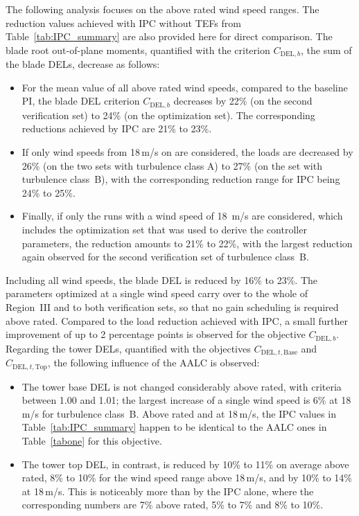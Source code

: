 The following analysis focuses on the above rated wind speed ranges. The reduction values achieved with IPC without TEFs from Table~\ref{tab:IPC_summary} are also provided here for direct comparison. The blade root out-of-plane moments, quantified with the criterion $C_{\text{DEL},b}$, the sum of the blade DELs, decrease as follows:
\begin{itemize}
    \item For the mean value of all above rated wind speeds, compared to the baseline PI, the blade DEL criterion $C_{\text{DEL},b}$ decreases by 22\% (on the second verification set) to 24\% (on the optimization set). The corresponding reductions achieved by IPC are 21\% to 23\%. 
    \item If only wind speeds from 18\,m/s on are considered, the loads are decreased by 26\% (on the two sets with turbulence class A) to 27\% (on the set with turbulence class~B), with the corresponding reduction range for IPC being 24\% to 25\%.
    \item Finally, if only the runs with a wind speed of 18~m/s are considered, which includes the optimization set that was used to derive the controller parameters, the reduction amounts to 21\% to 22\%, with the largest reduction again observed for the second verification set of turbulence class~B. 
\end{itemize} 
Including all wind speeds, the blade DEL is reduced by 16\% to 23\%. The parameters optimized at a single wind speed carry over to the whole of Region~III and to both verification sets, so that no gain scheduling is required above rated. Compared to the load reduction achieved with IPC, a small further improvement of up to 2 percentage points is observed for the objective $C_{\text{DEL},b}$.
%
Regarding the tower DELs, quantified with the objectives $C_{\text{DEL},t,\text{Base}}$ and $C_{\text{DEL},t,\text{Top}}$, the following influence of the AALC is observed:
\begin{itemize}
    \item The tower base DEL is not changed considerably above rated, with criteria between 1.00 and 1.01; the largest increase of a single wind speed is 6\% at 18\,m/s for turbulence class~B. Above rated and at 18\,m/s, the IPC values in Table~\ref{tab:IPC_summary} happen to be identical to the AALC ones in Table~\ref{tabone} for this objective.
    \item The tower top DEL, in contrast, is reduced by 10\% to 11\% on average above rated, 8\% to 10\% for the wind speed range above 18\,m/s, and by 10\% to 14\% at 18\,m/s. This is noticeably more than by the IPC alone, where the corresponding numbers are 7\% above rated, 5\% to 7\% and 8\% to 10\%. 
\end{itemize}
